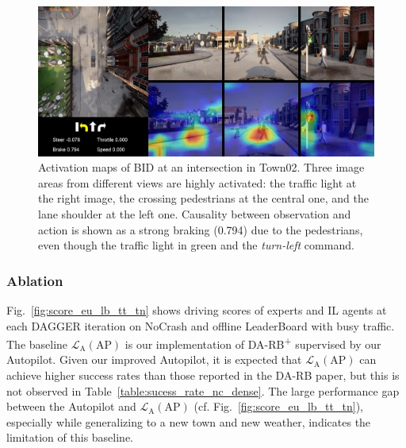 \begin{figure}[ht!]
	\centering
	\includegraphics[width=\linewidth]{fig/attention_ped_greed.jpg}
	\caption{Activation maps of BID at an intersection in Town02. 
		Three image areas from different views are highly activated: 
		the traffic light at the right image, the crossing pedestrians at the central one, and the lane shoulder at the left one. 
		Causality between observation and action is shown as a strong braking (0.794) due to the pedestrians, even though the traffic light in green and the \emph{turn-left} command.}
	\label{fig:attention_ped_greed}
\end{figure}



\subsubsection{Ablation}

Fig.~\ref{fig:score_eu_lb_tt_tn} shows driving scores of experts and IL agents at each DAGGER iteration on NoCrash and offline LeaderBoard with busy traffic.
The baseline $\mathcal{L}_\text{A}(\text{AP})$ is our implementation of DA-RB\textsuperscript{+} supervised by our Autopilot. 
Given our improved Autopilot, it is expected that $\mathcal{L}_\text{A}(\text{AP})$ can achieve higher success rates than those reported in the DA-RB paper, but this is not observed in Table~\ref{table:sucess_rate_nc_dense}.
The large performance gap between the Autopilot and $\mathcal{L}_\text{A}(\text{AP})$ (cf. Fig.~\ref{fig:score_eu_lb_tt_tn}), especially while generalizing to a new town and new weather, indicates the limitation of this baseline.


